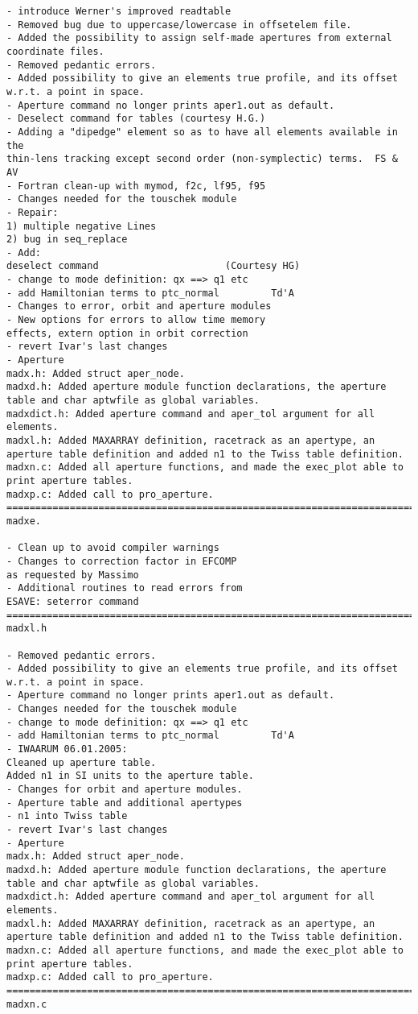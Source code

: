 \begin{verbatim}
- introduce Werner's improved readtable
- Removed bug due to uppercase/lowercase in offsetelem file.
- Added the possibility to assign self-made apertures from external
coordinate files.
- Removed pedantic errors.
- Added possibility to give an elements true profile, and its offset
w.r.t. a point in space.
- Aperture command no longer prints aper1.out as default.
- Deselect command for tables (courtesy H.G.)
- Adding a "dipedge" element so as to have all elements available in the
thin-lens tracking except second order (non-symplectic) terms.  FS & AV
- Fortran clean-up with mymod, f2c, lf95, f95
- Changes needed for the touschek module
- Repair:
1) multiple negative Lines
2) bug in seq_replace
- Add:
deselect command                      (Courtesy HG)
- change to mode definition: qx ==> q1 etc
- add Hamiltonian terms to ptc_normal         Td'A
- Changes to error, orbit and aperture modules
- New options for errors to allow time memory
effects, extern option in orbit correction
- revert Ivar's last changes
- Aperture
madx.h: Added struct aper_node.
madxd.h: Added aperture module function declarations, the aperture
table and char aptwfile as global variables.
madxdict.h: Added aperture command and aper_tol argument for all elements.
madxl.h: Added MAXARRAY definition, racetrack as an apertype, an
aperture table definition and added n1 to the Twiss table definition.
madxn.c: Added all aperture functions, and made the exec_plot able to
print aperture tables.
madxp.c: Added call to pro_aperture.
=============================================================================
madxe.

- Clean up to avoid compiler warnings
- Changes to correction factor in EFCOMP
as requested by Massimo
- Additional routines to read errors from
ESAVE: seterror command
=============================================================================
madxl.h

- Removed pedantic errors.
- Added possibility to give an elements true profile, and its offset
w.r.t. a point in space.
- Aperture command no longer prints aper1.out as default.
- Changes needed for the touschek module
- change to mode definition: qx ==> q1 etc
- add Hamiltonian terms to ptc_normal         Td'A
- IWAARUM 06.01.2005:
Cleaned up aperture table.
Added n1 in SI units to the aperture table.
- Changes for orbit and aperture modules.
- Aperture table and additional apertypes
- n1 into Twiss table
- revert Ivar's last changes
- Aperture
madx.h: Added struct aper_node.
madxd.h: Added aperture module function declarations, the aperture
table and char aptwfile as global variables.
madxdict.h: Added aperture command and aper_tol argument for all elements.
madxl.h: Added MAXARRAY definition, racetrack as an apertype, an
aperture table definition and added n1 to the Twiss table definition.
madxn.c: Added all aperture functions, and made the exec_plot able to
print aperture tables.
madxp.c: Added call to pro_aperture.
=============================================================================
madxn.c


\end{verbatim}
